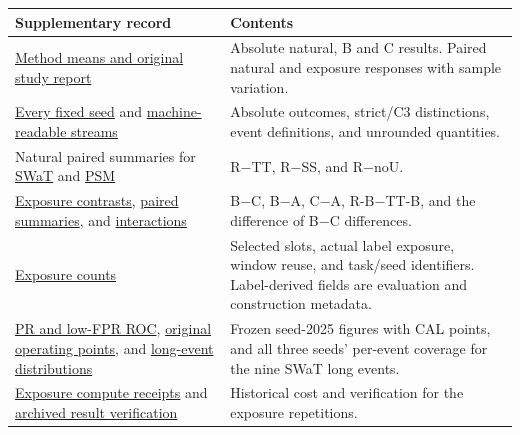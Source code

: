 \documentclass[
  american,
]{article}
\begin{document}
\begin{longtable}[]{@{}
  >{\raggedright\arraybackslash}p{}
  >{\raggedright\arraybackslash}p{}@{}}
\toprule\noalign{}
\begin{minipage}[b]{\linewidth}\raggedright
Supplementary record
\end{minipage} & \begin{minipage}[b]{\linewidth}\raggedright
Contents
\end{minipage} \\
\midrule\noalign{}
\endhead
\bottomrule\noalign{}
\endlastfoot
\href{../../docs/experiments/left_replay_exposure_repeat_20261118/RESULTS.md}{Method
means and original study report} & Absolute natural, B and C results.
Paired natural and exposure responses with sample variation. \\
\href{../../docs/experiments/left_replay_exposure_repeat_20261118/PER_SEED_TABLE.md}{Every
fixed seed} and
\href{../../docs/experiments/left_replay_exposure_repeat_20261118/comparison.csv}{machine-readable
streams} & Absolute outcomes, strict/C3 distinctions, event definitions,
and unrounded quantities. \\
Natural paired summaries for
\href{../../docs/experiments/left_swat_replay_repeat_20261118/paired_summary.csv}{SWaT}
and
\href{../../docs/experiments/left_psm_replay_20261118/paired_summary.csv}{PSM}
& R−TT, R−SS, and R−noU. \\
\href{../../docs/experiments/left_replay_exposure_repeat_20261118/contrasts.csv}{Exposure
contrasts},
\href{../../docs/experiments/left_replay_exposure_repeat_20261118/paired_summary.csv}{paired
summaries}, and
\href{../../docs/experiments/left_replay_exposure_repeat_20261118/interaction.csv}{interactions}
& B−C, B−A, C−A, R-B−TT-B, and the difference of B−C differences. \\
\href{../../docs/experiments/left_replay_exposure_repeat_20261118/exposure_by_seed.csv}{Exposure
counts} & Selected slots, actual label exposure, window reuse, and
task/seed identifiers. Label-derived fields are evaluation and
construction metadata. \\
\href{../../docs/experiments/left_replay_exposure_repeat_20261118/curves/PR_lowFPR_ROC.png}{PR
and low-FPR ROC},
\href{../../docs/experiments/left_replay_exposure_repeat_20261118/curves/operating_points.csv}{original
operating points}, and
\href{../../docs/experiments/left_replay_exposure_repeat_20261118/all_seed_nine_long_events.csv}{long-event
distributions} & Frozen seed-2025 figures with CAL points, and all three
seeds' per-event coverage for the nine SWaT long events. \\
\href{../../docs/experiments/left_replay_exposure_repeat_20261118/resource_summary.json}{Exposure
compute receipts} and
\href{../../docs/experiments/left_replay_exposure_repeat_20261118/verification_summary.json}{archived
result verification} & Historical cost and verification for the exposure
repetitions. \\
\end{longtable}
\end{document}
